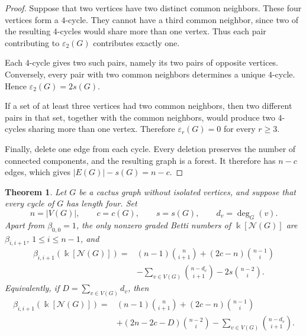 \documentclass[11pt]{amsart}
\newtheorem{theorem}{Theorem}[section]
\theoremstyle{definition}
\theoremstyle{remark}
\numberwithin{equation}{section}
\newcommand{\NN}{\mathcal N}
\begin{document}
	\begin{proof}
		Suppose that two vertices have two distinct common neighbors. These four
		vertices form a \(4\)-cycle. They cannot have a third common neighbor, since
		two of the resulting \(4\)-cycles would share more than one vertex. Thus each
		pair contributing to \(\varepsilon_2(G)\) contributes exactly one.

		Each \(4\)-cycle gives two such pairs, namely its two pairs of opposite
		vertices. Conversely, every pair with two common neighbors determines a
		unique \(4\)-cycle. Hence \(\varepsilon_2(G)=2s(G)\).

		If a set of at least three vertices had two common neighbors, then two
		different pairs in that set, together with the common neighbors, would produce
		two \(4\)-cycles sharing more than one vertex. Therefore
		\(\varepsilon_r(G)=0\) for every \(r\ge3\).

		Finally, delete one edge from each cycle. Every deletion preserves the number
		of connected components, and the resulting graph is a forest. It therefore
		has \(n-c\) edges, which gives \(|E(G)|-s(G)=n-c\).
	\end{proof}

	\begin{theorem}\label{thm:cactus-formula}
		Let \(G\) be a cactus graph without isolated vertices, and suppose that every
		cycle of \(G\) has length four. Set
		\[
		n=|V(G)|,\qquad c=c(G),\qquad s=s(G),\qquad d_v=\deg_G(v).
		\]
		Apart from \(\beta_{0,0}=1\), the only nonzero graded Betti numbers of
		\(\Bbbk[\NN(G)]\) are \(\beta_{i,i+1}\), \(1\le i\le n-1\), and
		\begin{equation}\label{eq:cactus-formula}
		\begin{aligned}
		\beta_{i,i+1}(\Bbbk[\NN(G)])
		={}&(n-1)\binom{n}{i+1}
		+(2c-n)\binom{n-1}{i}\\
		&-\sum_{v\in V(G)}\binom{n-d_v}{i+1}
		-2s\binom{n-2}{i}.
		\end{aligned}
		\end{equation}
		Equivalently, if \(D=\sum_{v\in V(G)}d_v\), then
		\begin{equation}\label{eq:cactus-degree-formula}
		\begin{aligned}
		\beta_{i,i+1}(\Bbbk[\NN(G)])
		={}&(n-1)\binom{n}{i+1}
		+(2c-n)\binom{n-1}{i}\\
		&+(2n-2c-D)\binom{n-2}{i}
		-\sum_{v\in V(G)}\binom{n-d_v}{i+1}.
		\end{aligned}
		\end{equation}
	\end{theorem}
\end{document}
